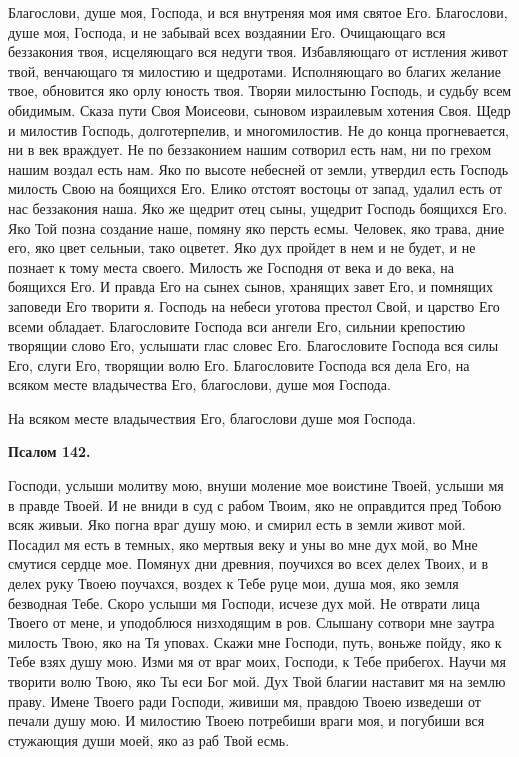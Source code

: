 Благослови, душе моя, Господа, и вся внутреняя моя имя святое Его. Благослови, душе моя, Господа, и не забывай всех воздаянии Его. Очищающаго вся беззакония твоя, исцеляющаго вся недуги твоя. Избавляющаго от истления живот твой, венчающаго тя милостию и щедротами. Исполняющаго во благих желание твое, обновится яко орлу юность твоя. Творяи милостыню Господь, и судьбу всем обидимым. Сказа пути Своя Моисеови, сыновом израилевым хотения Своя. Щедр и милостив Господь, долготерпелив, и многомилостив. Не до конца прогневается, ни в век враждует. Не по беззаконием нашим сотворил есть нам, ни по грехом нашим воздал есть нам. Яко по высоте небесней от земли, утвердил есть Господь милость Свою на боящихся Его. Елико отстоят востоцы от запад, удалил есть от нас беззакония наша. Яко же щедрит отец сыны, ущедрит Господь боящихся Его. Яко Той позна создание наше, помяну яко персть есмы. Человек, яко трава, дние его, яко цвет сельныи, тако оцветет. Яко дух пройдет в нем и не будет, и не познает к тому места своего. Милость же Господня от века и до века, на боящихся Его. И правда Его на сынех сынов, хранящих завет Его, и помнящих заповеди Его творити я. Господь на небеси уготова престол Свой, и царство Его всеми обладает. Благословите Господа вси ангели Его, сильнии крепостию творящии слово Его, услышати глас словес Его. Благословите Господа вся силы Его, слуги Его, творящии волю Его. Благословите Господа вся дела Его, на всяком месте владычества Его, благослови, душе моя Господа.

На всяком месте владычествия Его, благослови душе моя Господа.


\medskip


\bfseries Псалом 142.\normalfont{}\nopagebreak


Господи, услыши молитву мою, внуши моление мое воистине Твоей, услыши мя в правде Твоей. И не вниди в суд с рабом Твоим, яко не оправдится пред Тобою всяк живыи. Яко погна враг душу мою, и смирил есть в земли живот мой. Посадил мя есть в темных, яко мертвыя веку и уны во мне дух мой, во Мне смутися сердце мое. Помянух дни древния, поучихся во всех делех Твоих, и в делех руку Твоею поучахся, воздех к Тебе руце мои, душа моя, яко земля безводная Тебе. Скоро услыши мя Господи, исчезе дух мой. Не отврати лица Твоего от мене, и уподоблюся низходящим в ров. Слышану сотвори мне заутра милость Твою, яко на Тя уповах. Скажи мне Господи, путь, воньже пойду, яко к Тебе взях душу мою. Изми мя от враг моих, Господи, к Тебе прибегох. Научи мя творити волю Твою, яко Ты еси Бог мой. Дух Твой благии наставит мя на землю праву. Имене Твоего ради Господи, живиши мя, правдою Твоею изведеши от печали душу мою. И милостию Твоею потребиши враги моя, и погубиши вся стужающия души моей, яко аз раб Твой есмь.

